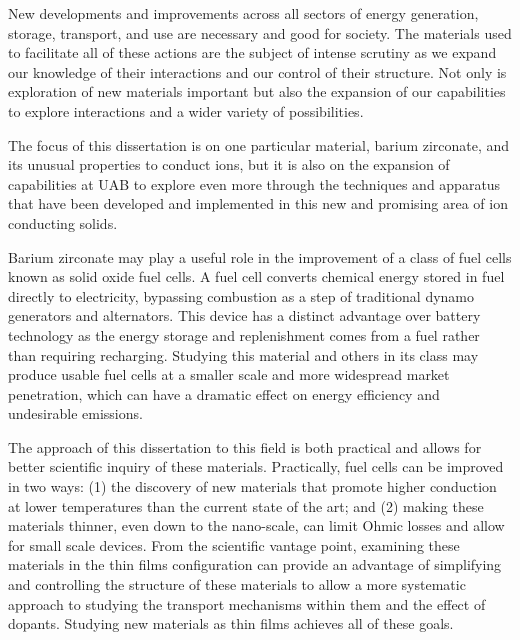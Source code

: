 New developments and improvements across all sectors of energy generation, storage, transport, and use are necessary and good for society. The materials used to facilitate all of these actions are the subject of intense scrutiny as we expand our knowledge of their interactions and our control of their structure. Not only is exploration of new materials important but also the expansion of our capabilities to explore interactions and a wider variety of possibilities. 

The focus of this dissertation is on one particular material, barium zirconate, and its unusual properties to conduct ions, but it is also on the expansion of capabilities at UAB to explore even more through the techniques and apparatus that have been developed and implemented in this new and promising area of ion conducting solids. 

Barium zirconate may play a useful role in the improvement of a class of fuel cells known as solid oxide fuel cells. A fuel cell converts chemical energy stored in fuel directly to electricity, bypassing combustion as a step of traditional dynamo generators and alternators. This device has a distinct advantage over battery technology as the energy storage and replenishment comes from a fuel rather than requiring recharging. Studying this material and others in its class may produce usable fuel cells at a smaller scale and more widespread market penetration, which can have a dramatic effect on energy efficiency and undesirable emissions.

The approach of this dissertation to this field is both practical and allows for better scientific inquiry of these materials. Practically, fuel cells can be improved in two ways: (1) the discovery of new materials that promote higher conduction at lower temperatures than the current state of the art; and (2) making these materials thinner, even down to the nano-scale, can limit Ohmic losses and allow for small scale devices. From the scientific vantage point, examining these materials in the thin films configuration can provide an advantage of simplifying and controlling the structure of these materials to allow a more systematic approach to studying the transport mechanisms within them and the effect of dopants. Studying new materials as thin films achieves all of these goals. 

